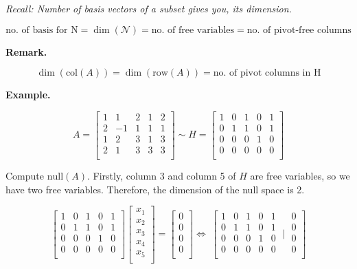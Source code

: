 \documentclass[
]{article}
\begin{document}
\emph{Recall: Number of basis vectors of a subset gives you, its
dimension.}

$$\text{no.\ of\ basis\ for\ N} = \dim\left( \mathcal{N} \right) = \text{no.\ of\ free\ variables} = \text{no.\ of\ pivot-free\ columns}$$

\textbf{Remark.}

$$\dim\left( \text{col}(A) \right) = \dim\left( \text{row}(A) \right) = \text{no.\ of\ pivot\ columns\ in\ H}$$

\textbf{Example.}

$$A = \begin{bmatrix}
1 & 1 & 2 & 1 & 2 \\
2 & - 1 & 1 & 1 & 1 \\
1 & 2 & 3 & 1 & 3 \\
2 & 1 & 3 & 3 & 3 \\
\end{bmatrix}\sim H = \begin{bmatrix}
1 & 0 & 1 & 0 & 1 \\
0 & 1 & 1 & 0 & 1 \\
0 & 0 & 0 & 1 & 0 \\
0 & 0 & 0 & 0 & 0 \\
\end{bmatrix}$$

Compute $\text{null}(A)$. Firstly, column 3 and column 5 of $H$ are
free variables, so we have two free variables. Therefore, the dimension
of the null space is 2.

$$\begin{bmatrix}
1 & 0 & 1 & 0 & 1 \\
0 & 1 & 1 & 0 & 1 \\
0 & 0 & 0 & 1 & 0 \\
0 & 0 & 0 & 0 & 0 \\
\end{bmatrix}\begin{bmatrix}
x_{1} \\
x_{2} \\
x_{3} \\
x_{4} \\
x_{5} \\
\end{bmatrix} = \begin{bmatrix}
0 \\
0 \\
0 \\
0 \\
\end{bmatrix} \Leftrightarrow \ \left\lbrack \begin{matrix}
1 & 0 & 1 & 0 & 1 \\
0 & 1 & 1 & 0 & 1 \\
0 & 0 & 0 & 1 & 0 \\
0 & 0 & 0 & 0 & 0 \\
\end{matrix}\mid\begin{matrix}
0 \\
0 \\
0 \\
0 \\
\end{matrix} \right\rbrack$$
\end{document}
